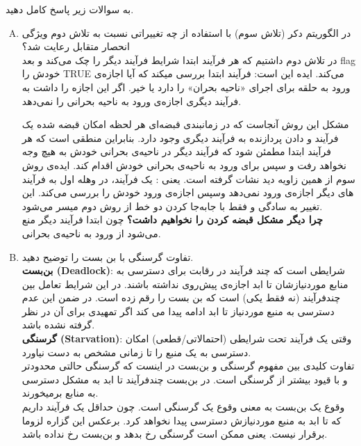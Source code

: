 \documentclass[]{article}
\begin{document}
به سوالات زیر پاسخ کامل دهید.
\vspace{0.2cm}
\begin{enumerate}[(A)]
      \item در الگوریتم دکر (تلاش سوم) با استفاده از چه تغییراتی نسبت به تلاش دوم ویژگی انحصار متقابل رعایت شد؟
            \\
            در تلاش دوم داشتیم که هر فرآیند ابتدا شرایط فرآیند دیگر را چک می‌کند و بعد flag
            خودش را TRUE می‌کند.
            ایده این است:
            فرآیند ابتدا بررسی میکند که آیا اجازه‌ی ورود به حلقه برای اجرای
            «ناحیه بحران»
            را دارد یا خیر.
            اگر این اجازه را داشت به فرآیند دیگری اجازه‌ی ورود به ناحیه بحرانی را نمی‌دهد.

            مشکل این روش آنجاست که در زمانبندی قبضه‌ای هر لحظه امکان قبضه شده یک فرآیند و دادن
            پردازنده به فرآیند دیگری وجود دارد.
            بنابراین منطقی است که هر فرآیند ابتدا مطمئن شود که فرآیند دیگر در ناحیه‌ی بحرانی خودش به هیچ وجه نخواهد رفت و
            سپس برای ورود به ناحیه‌ی بحرانی خودش اقدام کند. ایده‌ی روش سوم از همین زاویه دید نشات گرفته است.
            یعنی : یک فرآیند، در وهله اول به فرآیند های دیگر اجازه‌ی ورود نمی‌دهد وسپس اجازه‌ی ورود خودش را بررسی می‌کند.
            این تغییر به سادگی و فقط با جابه‌جا کردن دو خط از روش دوم میسر می‌شود.
            \\
            \textbf{چرا دیگر مشکل قبضه کردن را نخواهیم داشت؟}
            چون ابتدا فرآیند دیگر منع می‌شود از ورود به ناحیه‌ی بحرانی.

      \item  تفاوت گرسنگی با بن بست را توضیح دهید.
            \\ \textbf{بن‌بست (Deadlock)}:
            شرایطی است که چند فرآیند در رقابت برای دسترسی به منابع موردنیازشان تا ابد اجازه‌ی پیش‌روی نداشته باشند.
            در این شرایط تعامل بین چندفرآیند (نه فقط یکی) است که بن بست را رقم زده است.
            در ضمن این عدم دسترسی به منبع موردنیاز تا ابد ادامه پیدا می‌ کند اگر تمهیدی برای آن در نظر گرفته نشده باشد.
            \\ \textbf{گرسنگی (Starvation)}:
            وقتی یک فرآیند تحت شرایطی (احتماﻻتی/قطعی) امکان دسترسی به یک منبع را تا زمانی مشخص به دست نیاورد.
            \\
            تفاوت کلیدی بین مفهوم گرسنگی و بن‌بست در اینست که گرسنگی حالتی محدودتر و با قیود بیشتر از گرسنگی است. در بن‌بست چندفرآیند تا ابد به مشکل دسترسی به منابع برمیخورند.
            \\
            وقوع یک بن‌بست به معنی وقوع یک گرسنگی است. چون حداقل یک فرآیند داریم که تا ابد به منبع موردنیازش دسترسی پیدا نخواهد کرد.
            برعکس این گزاره لزوما برقرار نیست. یعنی ممکن است گرسنگی رخ بدهد و بن‌بست رخ نداده باشد.


\end{enumerate}
\end{document}
